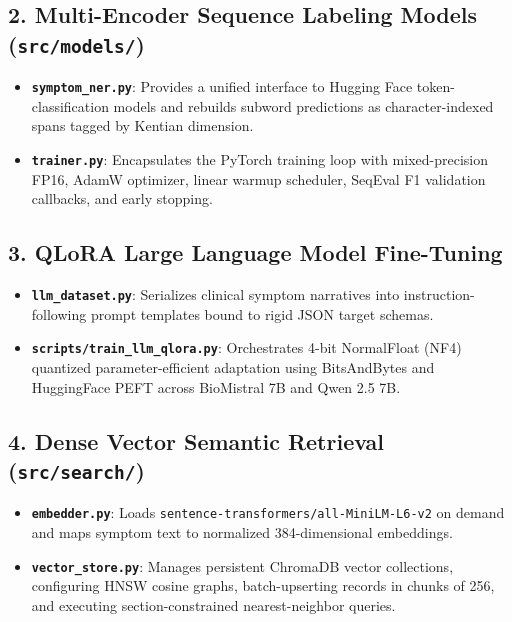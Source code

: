 \subsection{2. Multi-Encoder Sequence Labeling Models (\texttt{src/models/})}
\begin{itemize}
  \item \textbf{\texttt{symptom\_ner.py}}: Provides a unified interface to Hugging Face token-classification models and rebuilds subword predictions as character-indexed spans tagged by Kentian dimension.
  \item \textbf{\texttt{trainer.py}}: Encapsulates the PyTorch training loop with mixed-precision FP16, AdamW optimizer, linear warmup scheduler, SeqEval F1 validation callbacks, and early stopping.
\end{itemize}

\subsection{3. QLoRA Large Language Model Fine-Tuning}
\begin{itemize}
  \item \textbf{\texttt{llm\_dataset.py}}: Serializes clinical symptom narratives into instruction-following prompt templates bound to rigid JSON target schemas.
  \item \textbf{\texttt{scripts/train\_llm\_qlora.py}}: Orchestrates 4-bit NormalFloat (NF4) quantized parameter-efficient adaptation using BitsAndBytes and HuggingFace PEFT across BioMistral 7B and Qwen 2.5 7B.
\end{itemize}

\subsection{4. Dense Vector Semantic Retrieval (\texttt{src/search/})}
\begin{itemize}
  \item \textbf{\texttt{embedder.py}}: Loads \texttt{sentence-transformers/all-MiniLM-L6-v2} on demand and maps symptom text to normalized 384-dimensional embeddings.
  \item \textbf{\texttt{vector\_store.py}}: Manages persistent ChromaDB vector collections, configuring HNSW cosine graphs, batch-upserting records in chunks of 256, and executing section-constrained nearest-neighbor queries.
\end{itemize}

